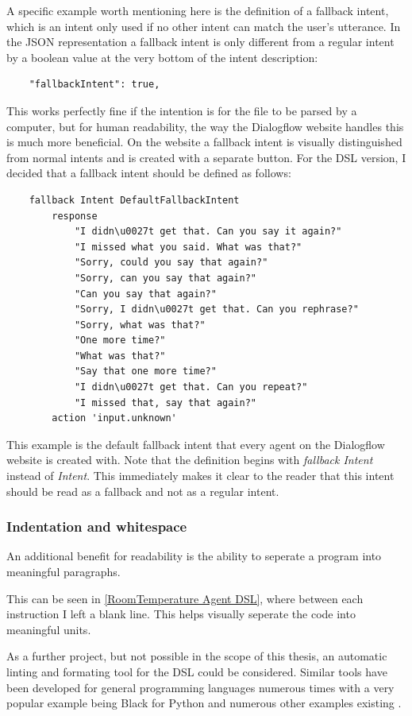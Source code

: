 A specific example worth mentioning here is the definition of a fallback intent, which is an intent only used if no other intent can match the user's utterance.
In the JSON representation a fallback intent is only different from a regular intent by a boolean value at the very bottom of the intent description:
\begin{verbatim}
    "fallbackIntent": true,
\end{verbatim}
This works perfectly fine if the intention is for the file to be parsed by a computer, but for human readability, the way the Dialogflow website handles this is much more beneficial.
On the website a fallback intent is visually distinguished from normal intents and is created with a separate button.
For the DSL version, I decided that a fallback intent should be defined as follows:
\begin{verbatim}
    fallback Intent DefaultFallbackIntent
        response 
            "I didn\u0027t get that. Can you say it again?"
            "I missed what you said. What was that?"
            "Sorry, could you say that again?"
            "Sorry, can you say that again?"
            "Can you say that again?"
            "Sorry, I didn\u0027t get that. Can you rephrase?"
            "Sorry, what was that?"
            "One more time?"
            "What was that?"
            "Say that one more time?"
            "I didn\u0027t get that. Can you repeat?"
            "I missed that, say that again?"
        action 'input.unknown'
\end{verbatim}
This example is the default fallback intent that every agent on the Dialogflow website is created with. Note that the definition begins with \textit{fallback Intent} instead of \textit{Intent}. This immediately makes it clear to the reader that this intent should be read as a fallback and not as a regular intent.

\subsubsection{Indentation and whitespace}

An additional benefit for readability is the ability to seperate a program into meaningful paragraphs.

This can be seen in \autoref{RoomTemperature Agent DSL}, where between each instruction I left a blank line. This helps visually seperate the code into meaningful units.

As a further project, but not possible in the scope of this thesis, an automatic linting and formating tool for the DSL could be considered. Similar tools have been developed for general programming languages numerous times with a very popular example being Black for Python \cite{Python} and numerous other examples existing \cite{Github}.

